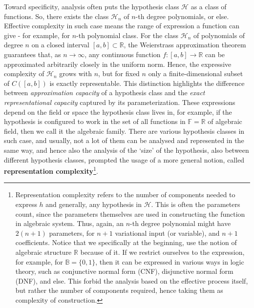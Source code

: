 Toward specificity, analysis often puts the hypothesis class $\mathcal{H}$ as a class of functions. So, there exists the class $\mathcal{H}_{n}$ of $n$-th degree polynomials, or else. Effective complexity in such case means the range of expression a function can give - for example, for $n$-th polynomial class. For the class $\mathcal{H}_n$ of polynomials of degree $n$ on a closed interval $[a,b]\subset \mathbb{R}$, the Weierstrass approximation theorem guarantees that, as $n\to \infty$, any continuous function $f:[a,b]\to \mathbb{R}$ can be approximated arbitrarily closely in the uniform norm. Hence, the expressive complexity of $\mathcal{H}_n$ grows with $n$, but for fixed $n$ only a finite-dimensional subset of $C([a,b])$ is exactly representable. This distinction highlights the difference between \emph{approximation capacity} of a hypothesis class and the \emph{exact representational capacity} captured by its parameterization. These expressions depend on the field or space the hypothesis class lives in, for example, if the hypothesis is configured to work in the set of all functions in $\mathbb{F}=\mathbb{R}$ of algebraic field, then we call it the algebraic family. There are various hypothesis classes in such case, and usually, not a lot of them can be analysed and represented in the same way, and hence also the analysis of the `size' of the hypothesis, also between different hypothesis classes, prompted the usage of a more general notion, called \textbf{representation complexity}\footnote{Representation complexity refers to the number of components needed to express $h$ and generally, any hypothesis in $\mathcal{H}$. This is often the parameters count, since the parameters themselves are used in constructing the function in algebraic system. Thus, again, an $n$-th degree polynomial might have $2(n+1)$ parameters, for $n+1$ variational input (or variable), and $n+1$ coefficients. Notice that we specifically at the beginning, use the notion of algebraic structure $\mathbb{R}$ because of it. If we restrict ourselves to the expression, for example, for $\mathbb{B}=\{0,1\}$, then it can be expressed in various ways in logic theory, such as conjunctive normal form (CNF), disjunctive normal form (DNF), and else. This forbid the analysis based on the effective process itself, but rather the number of components required, hence taking them as complexity of construction.}.


